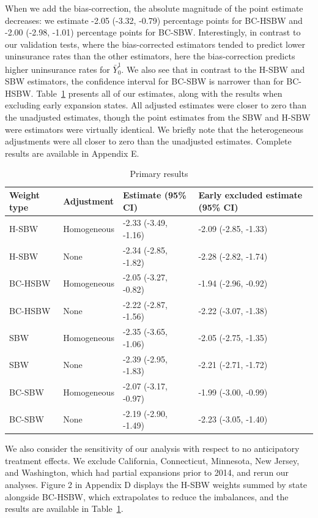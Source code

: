 \documentclass[aoas]{imsart}
\theoremstyle{plain}
\theoremstyle{remark}
\begin{document}
When we add the bias-correction, the absolute magnitude of the point estimate decreases: we estimate -2.05 (-3.32, -0.79) percentage points for BC-HSBW and -2.00 (-2.98, -1.01) percentage points for BC-SBW. Interestingly, in contrast to our validation tests, where the bias-corrected estimators tended to predict lower uninsurance rates than the other estimators, here the bias-correction predicts higher uninsurance rates for $\bar{Y}^1_0$. We also see that in contrast to the H-SBW and SBW estimators, the confidence interval for BC-SBW is narrower than for BC-HSBW. Table~\ref{tab:mainresults} presents all of our estimates, along with the results when excluding early expansion states. All adjusted estimates were closer to zero than the unadjusted estimates, though the point estimates from the SBW and H-SBW were estimators were virtually identical. We briefly note that the heterogeneous adjustments were all closer to zero than the unadjusted estimates. Complete results are available in Appendix E.

\begin{table}[ht]
\label{tab:mainresults}
\caption{Primary results}
\begin{tabular}{llll}
  \hline
Weight type & Adjustment & Estimate (95\% CI) & Early excluded estimate (95\% CI) \\ 
  \hline
H-SBW & Homogeneous & -2.33 (-3.49, -1.16) & -2.09 (-2.85, -1.33) \\ 
  H-SBW & None & -2.34 (-2.85, -1.82) & -2.28 (-2.82, -1.74) \\ 
  BC-HSBW & Homogeneous & -2.05 (-3.27, -0.82) & -1.94 (-2.96, -0.92) \\ 
  BC-HSBW & None & -2.22 (-2.87, -1.56) & -2.22 (-3.07, -1.38) \\ 
  SBW & Homogeneous & -2.35 (-3.65, -1.06) & -2.05 (-2.75, -1.35) \\ 
  SBW & None & -2.39 (-2.95, -1.83) & -2.21 (-2.71, -1.72) \\ 
  BC-SBW & Homogeneous & -2.07 (-3.17, -0.97) & -1.99 (-3.00, -0.99) \\ 
  BC-SBW & None & -2.19 (-2.90, -1.49) & -2.23 (-3.05, -1.40) \\ 
   \hline
\end{tabular}
\end{table}

We also consider the sensitivity of our analysis with respect to no anticipatory treatment effects. We exclude California, Connecticut, Minnesota, New Jersey, and Washington, which had partial expansions prior to 2014, and rerun our analyses. Figure 2 in Appendix D displays the H-SBW weights summed by state alongside BC-HSBW, which extrapolates to reduce the imbalances, and the results are available in Table~\ref{tab:mainresults}.
\end{document}
